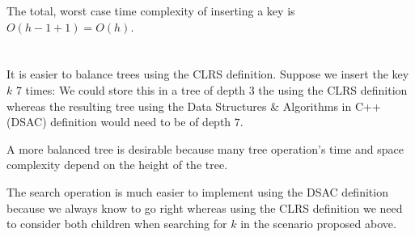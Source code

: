 \documentclass[12pt, a4paper]{article}
\begin{document}
The total, worst case time complexity of inserting a key is $O(h - 1 + 1) = O(h)$.

\section{} %
It is easier to balance trees using the CLRS definition. Suppose we insert the key $k$ 7 times: We could store this in a tree of depth $3$ the using the CLRS definition whereas the resulting tree using the Data Structures \& Algorithms in C++ (DSAC) definition would need to be of depth $7$.

A more balanced tree is desirable because many tree operation's time and space complexity depend on the height of the tree.

The search operation is much easier to implement using the DSAC definition because we always know to go right whereas using the CLRS definition we need to consider both children when searching for $k$ in the scenario proposed above.

\section{} %
\end{document}

